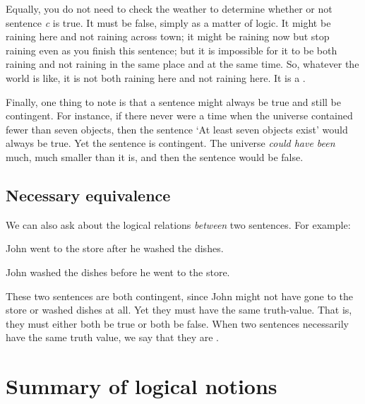 Equally, you do not need to check the weather to determine whether or not sentence \textit{c} is true. It must be false, simply as a matter of logic. It might be raining here and not raining across town; it might be raining now but stop raining even as you finish this sentence; but it is impossible for it to be both raining and not raining in the same place and at the same time. So, whatever the world is like, it is not both raining here and not raining here. It is a .

Finally, one thing to note is that a sentence might always be true and still be contingent. For instance, if there never were a time when the universe contained fewer than seven objects, then the sentence `At least seven objects exist' would always be true. Yet the sentence is contingent. The universe \textit{could have been} much, much smaller than it is, and then the sentence would be false. 

\subsection{Necessary equivalence}

We can also ask about the logical relations \emph{between} two sentences. For example:
\begin{earg}
\item[] John went to the store after he washed the dishes.
\item[] John washed the dishes before he went to the store.
\end{earg}
These two sentences are both contingent, since John might not have gone to the store or washed dishes at all. Yet they must have the same truth-value. That is, they must either both be true or both be false. When two sentences necessarily have the same truth value, we say that they are .


\section*{Summary of logical notions}

